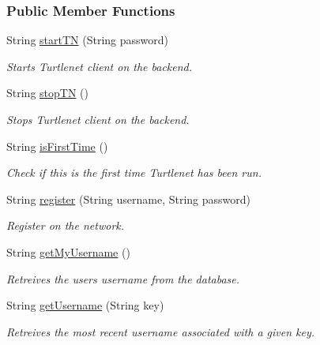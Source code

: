 \subsubsection*{Public Member Functions}
\begin{DoxyCompactItemize}
\item 
String \hyperlink{classballmerpeak_1_1turtlenet_1_1server_1_1TurtlenetImpl_ae95fc767bafaeab9ba8fd2ce0ace0dde}{start\-T\-N} (String password)
\begin{DoxyCompactList}\small\item\em Starts Turtlenet client on the backend. \end{DoxyCompactList}\item 
String \hyperlink{classballmerpeak_1_1turtlenet_1_1server_1_1TurtlenetImpl_a5a81c607293705d6bc5a9b5c087ef411}{stop\-T\-N} ()
\begin{DoxyCompactList}\small\item\em Stops Turtlenet client on the backend. \end{DoxyCompactList}\item 
String \hyperlink{classballmerpeak_1_1turtlenet_1_1server_1_1TurtlenetImpl_a64ed53b1b7c02e2a7869dba9a9adeb6b}{is\-First\-Time} ()
\begin{DoxyCompactList}\small\item\em Check if this is the first time Turtlenet has been run. \end{DoxyCompactList}\item 
String \hyperlink{classballmerpeak_1_1turtlenet_1_1server_1_1TurtlenetImpl_ad77aeae77cad163b1fcd099404747f91}{register} (String username, String password)
\begin{DoxyCompactList}\small\item\em Register on the network. \end{DoxyCompactList}\item 
String \hyperlink{classballmerpeak_1_1turtlenet_1_1server_1_1TurtlenetImpl_a4ad92d61008b207cf46dcfdc31e5ea22}{get\-My\-Username} ()
\begin{DoxyCompactList}\small\item\em Retreives the users username from the database. \end{DoxyCompactList}\item 
String \hyperlink{classballmerpeak_1_1turtlenet_1_1server_1_1TurtlenetImpl_a89342b1ea50df43e072c154fdd389d1c}{get\-Username} (String key)
\begin{DoxyCompactList}\small\item\em Retreives the most recent username associated with a given key. \end{DoxyCompactList}\item 

\end{DoxyCompactItemize}
